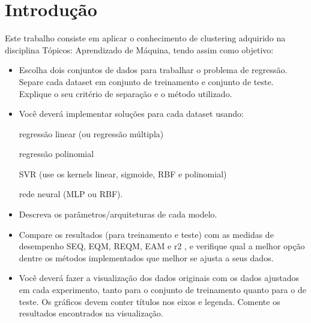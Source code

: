 \chapter{Introdução}\label{cap_intro}

Este trabalho consiste em aplicar o conhecimento de clustering adquirido na disciplina Tópicos: Aprendizado de Máquina, tendo assim como objetivo:

\begin{itemize}
	\item Escolha dois conjuntos de dados para trabalhar o problema de regressão. Separe cada dataset em conjunto de treinamento e conjunto de teste. Explique o seu critério de separação e o método utilizado.
	
	\item Você deverá implementar soluções para cada dataset usando:
	
	\subitem regressão linear (ou regressão múltipla)
	
	\subitem regressão polinomial
	
	\subitem SVR (use os kernels linear, sigmoide, RBF e polinomial)
	
	\subitem rede neural (MLP ou RBF).
	
	\item Descreva os parâmetros/arquiteturas de cada modelo.
	
	\item Compare os resultados (para treinamento e teste) com as medidas de desempenho SEQ, EQM, REQM, EAM e r2 , e verifique qual a melhor opção dentre os métodos implementados que melhor se ajusta a seus dados.
	
	\item Você deverá fazer a visualização dos dados originais com os dados ajustados em cada experimento, tanto para o conjunto de treinamento quanto para o de teste. Os gráficos devem conter títulos nos eixos e legenda. Comente os resultados encontrados na visualização.
\end{itemize}
